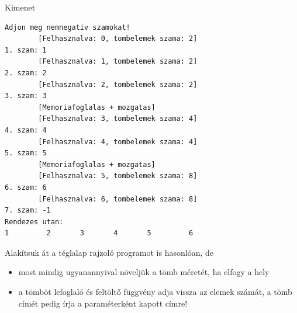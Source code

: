 \documentclass[usenames,dvipsnames,aspectratio=169]{beamer}
\begin{document}
\begin{frame}[fragile]
  \footnotesize
  \begin{block}{Kimenet}
    \vspace{-.3cm}
    \scriptsize
    \begin{verbatim}
Adjon meg nemnegativ szamokat!
        [Felhasznalva: 0, tombelemek szama: 2]
1. szam: 1
        [Felhasznalva: 1, tombelemek szama: 2]
2. szam: 2
        [Felhasznalva: 2, tombelemek szama: 2]
3. szam: 3
        [Memoriafoglalas + mozgatas]
        [Felhasznalva: 3, tombelemek szama: 4]
4. szam: 4
        [Felhasznalva: 4, tombelemek szama: 4]
5. szam: 5
        [Memoriafoglalas + mozgatas]
        [Felhasznalva: 5, tombelemek szama: 8]
6. szam: 6
        [Felhasznalva: 6, tombelemek szama: 8]
7. szam: -1
Rendezes utan:
1	      2       3	      4	      5     	6
\end{verbatim}
    \vspace{-.3cm}
  \end{block}
\end{frame}

\begin{frame}
  Alakítsuk át a téglalap rajzoló programot is hasonlóan, de
  \begin{itemize}
    \item most mindig ugyanannyival növeljük a tömb méretét, ha elfogy a hely
    \item a tömböt lefoglaló és feltöltő függvény adja vissza az elemek számát, a tömb címét pedig írja a paraméterként kapott  címre!
  \end{itemize}
  \begin{exampleblock}{}
    \scriptsize
    
  \end{exampleblock}
\end{frame}

\begin{frame}
  \begin{exampleblock}{}
    \scriptsize
    
  \end{exampleblock}
\end{frame}

\begin{frame}
  \begin{exampleblock}{}
    \scriptsize
    
  \end{exampleblock}
\end{frame}
\end{document}
